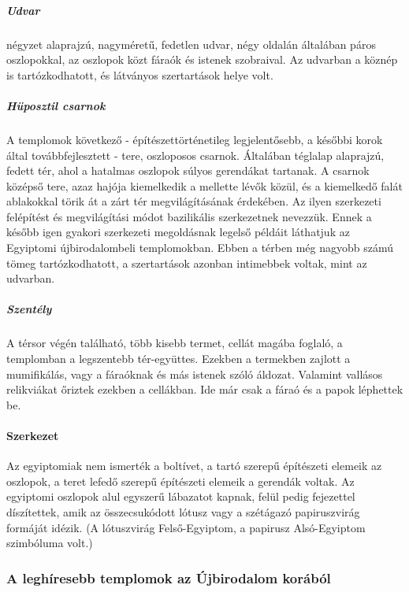 \subparagraph{Udvar} négyzet alaprajzú, nagyméretű, fedetlen udvar, négy oldalán általában páros oszlopokkal, az oszlopok közt fáraók és istenek szobraival. Az udvarban a köznép is tartózkodhatott, és látványos szertartások helye volt.

\subparagraph{Hüposztil csarnok} A templomok következő - építészettörténetileg legjelentősebb, a későbbi korok által továbbfejlesztett - tere, oszloposos csarnok. Általában téglalap alaprajzú, fedett tér, ahol a hatalmas oszlopok súlyos gerendákat tartanak. A csarnok középső tere, azaz hajója kiemelkedik a mellette lévők közül, és a kiemelkedő falát ablakokkal törik át a zárt tér megvilágításának érdekében. Az ilyen szerkezeti felépítést és megvilágítási módot bazilikális szerkezetnek nevezzük. Ennek a később igen gyakori szerkezeti megoldásnak legelső példáit láthatjuk az Egyiptomi újbirodalombeli templomokban. Ebben a térben még nagyobb számú tömeg tartózkodhatott, a szertartások azonban intimebbek voltak, mint az udvarban.

\subparagraph{Szentély} A térsor végén található, több kisebb termet, cellát magába foglaló, a templomban a legszentebb tér-együttes. Ezekben a termekben zajlott a mumifikálás, vagy a fáraóknak és más istenek szóló áldozat. Valamint vallásos relikviákat őriztek ezekben a cellákban. Ide már csak a fáraó és a papok léphettek be.

\paragraph{Szerkezet}
Az egyiptomiak nem ismerték a boltívet, a tartó szerepű építészeti elemeik az oszlopok, a teret lefedő szerepű építészeti elemeik a gerendák voltak. Az egyiptomi oszlopok alul egyszerű lábazatot kapnak, felül pedig fejezettel díszítettek, amik az összecsukódott lótusz vagy a szétágazó papiruszvirág formáját idézik. (A lótuszvirág Felső-Egyiptom, a papirusz Alsó-Egyiptom szimbóluma volt.)

\clearpage

\subsubsection*{A leghíresebb templomok az Újbirodalom korából}

\begin{figure}
\end{figure} 

